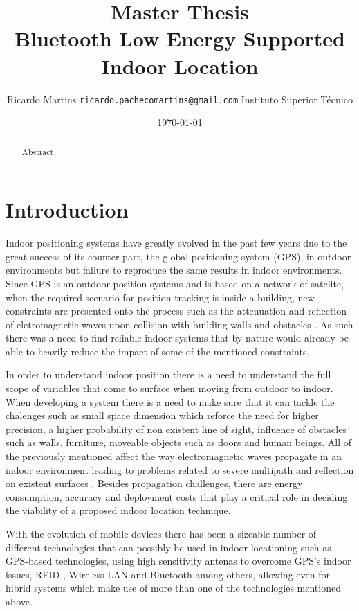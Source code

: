 \documentclass[a4paper]{IEEEtran}
\title{{ \normalsize Master Thesis} \\
	Bluetooth Low Energy Supported Indoor Location}
\author{
	Ricardo Martins {\tt ricardo.pachecomartins@gmail.com}
	Instituto Superior T\'{e}cnico}
\date{\today}
\begin{document}
\maketitle

\begin{abstract}

	Abstract

\end{abstract}

\section{Introduction}
\label{sec:Introduction}

Indoor positioning systems have greatly evolved in the past few years due to the great success of its counter-part, the global positioning system (GPS), in outdoor environments but failure to reproduce the same results in indoor environments. Since GPS is an outdoor position systems and is based on a network of satelite, when the required scenario for position tracking is inside a building, new constraints are presented onto the process such as the attenuation and reflection of eletromagnetic waves upon collision with building walls and obstacles \cite{surveygps}. As such there was a need to find reliable indoor systems that by nature would already be able to heavily reduce the impact of some of the mentioned constraints.

In order to understand indoor position there is a need to understand the full scope of variables that come to surface when moving from outdoor to indoor. When developing a system there is a need to make sure that it can tackle the chalenges such as small space dimension which reforce the need for higher precision, a higher probability of non existent line of sight, influence of obstacles such as walls, furniture, moveable objects such as doors and human beings\cite{reviewtechniques}. All of the previously mentioned affect the way electromagnetic waves propagate in an indoor environment leading to problems related to severe multipath and reflection on existent surfaces \cite{surveywireless}. Besides propagation challenges, there are energy consumption, accuracy and deployment costs that play a critical role in deciding the viability of a proposed indoor location technique.

With the evolution of mobile devices there has been a sizeable number of different technologies that can possibly be used in indoor locationing \cite{surveywireless,survey2,survey1} such as GPS-based technologies, using high sensitivity antenas to overcome GPS's indoor issues, RFID , Wireless LAN and Bluetooth among others, allowing even for hibrid systems which make use of more than one of the technologies mentioned above. 
\end{document}
